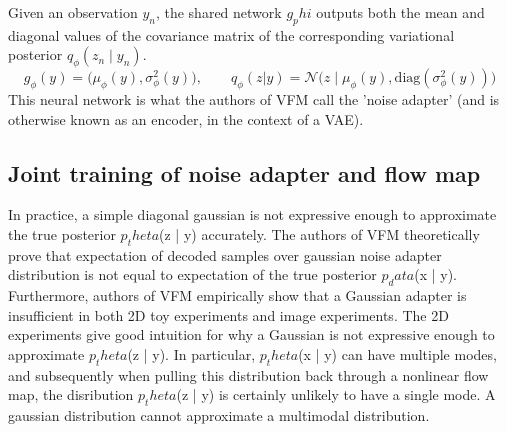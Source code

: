 \documentclass[12pt,a4paper]{report}
\begin{document}
Given an observation $y_n$, the shared network $g_phi$ outputs both the mean and diagonal values of the covariance matrix of the corresponding variational posterior $q_\phi(z_n\mid y_n)$.
$$g_\phi(y) = \big(\mu_\phi(y), \sigma_\phi^2(y)\big), \qquad q_\phi(z|y) = \mathcal{N}\big(z \mid \mu_\phi(y), \mathrm{diag}(\sigma_\phi^2(y))\big)$$
This neural network is what the authors of VFM call the 'noise adapter' (and is otherwise known as an encoder, in the context of a VAE). 

\subsection{Joint training of noise adapter and flow map}
In practice, a simple diagonal gaussian is not expressive enough to approximate the true posterior $p_theta$(z | y) accurately. 
The authors of VFM theoretically prove that expectation of decoded samples over gaussian noise adapter distribution is not equal to expectation of the true posterior $p_data$(x | y). 
Furthermore, authors of VFM empirically show that a Gaussian adapter is insufficient in both 2D toy experiments and image experiments. 
The 2D experiments give good intuition for why a Gaussian is not expressive enough to approximate $p_theta$(z | y). 
In particular, $p_theta$(x | y) can have multiple modes, and subsequently when pulling this distribution back through a nonlinear flow map, the disribution $p_theta$(z | y) is certainly unlikely to have a single mode. 
A gaussian distribution cannot approximate a multimodal distribution. 
\end{document}
